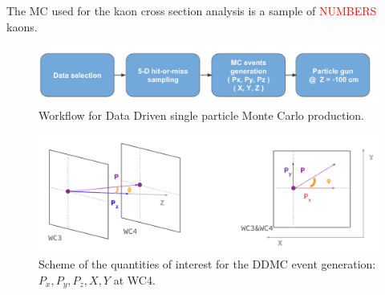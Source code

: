 The MC used for the kaon cross section analysis is a sample of \textcolor{red}{NUMBERS}  kaons.

\begin{figure}[hpbt]
\centering
\includegraphics[width=\textwidth]{Chapter-5/Images/DDMCScheme.png}
\caption{Workflow for Data Driven single particle Monte Carlo production.}
\label{fig:DDMCSketch}
\end{figure}


\begin{figure}[hpbt]
\centering
\includegraphics[width=\textwidth]{Chapter-5/Images/DDMCQuantities.png}
\caption{Scheme of the quantities of interest for the DDMC event generation: $P_x, P_y, P_z, X, Y$ at WC4.}
\label{fig:DDMCQuantities}
\end{figure}


